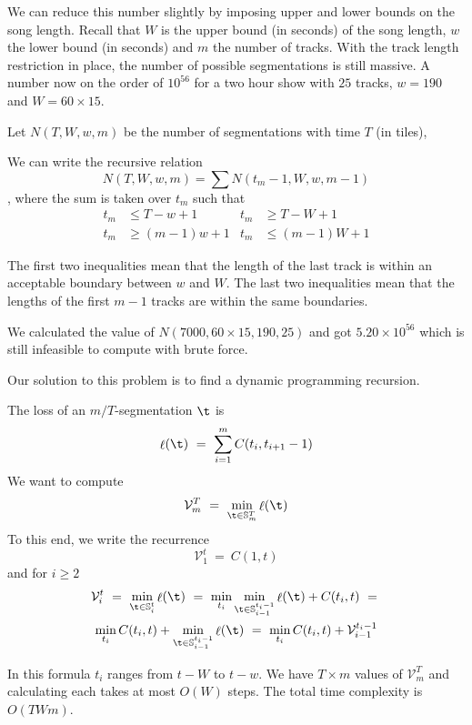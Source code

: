 \documentclass[twocolumn]{article}
\DeclareMathOperator{\loss}{\ell}
\newcommand{\segs}{\mathbb S}
\newcommand{\best}{\mathcal V}
\begin{document}
We can reduce this number slightly by imposing upper and lower bounds on the song length.  Recall that $W$ is the upper bound (in seconds) of the song length, $w$ the lower bound (in seconds) and $m$ the number of tracks. With the track length restriction in place, the number of possible segmentations is still massive. A number now on the order of $10^{56}$ for a two hour show with $25$ tracks, $w=190$ and $W=60\times15$.



  Let $N(T,W,w,m)$ be the number of segmentations with time $T$ (in tiles),

We can write the recursive relation $$N(T,W,w,m) = \sum N(t_m-1,W,w,m-1)$$, where the sum is taken over $t_m$ such that 
\begin{align*}
t_m &\le T-w+1 & t_m &\ge T-W+1\\
t_m &\ge (m-1)w+1 & t_m &\le (m-1)W+1
\end{align*}

The first two inequalities mean that the length of the last track is within an acceptable boundary between $w$ and $W$. The last two inequalities mean that the lengths of the first $m-1$ tracks are within the same boundaries. 

We calculated the value of $N(7000, 60\times15, 190, 25)$ and got $5.20 \times 10^{56}$ which is still infeasible to compute with brute force.



Our solution to this problem is to find a dynamic programming recursion.

The loss of an $m/T$-segmentation $\t$ is 
\[
\loss(\t) 
~=~
\sum_{i=1}^m C(t_i, t_{i+1}-1)
\]
We want to compute
\[
\best^T_m ~=~ \min_{\t \in \segs^T_m} \loss(\t)
\]
To this end, we write the recurrence
\begin{equation*}
\best^t_1 ~=~ C(1, t) 
\end{equation*}
and for $i\ge2$
\begin{multline*}
\best^t_i ~=~
\min_{\t \in \segs^t_i} \loss(\t)
~=~ \min_{t_i} \min_{\t \in \segs^{t_i-1}_{i-1}} \loss(\t) + C(t_i, t)~=~  \\
\min_{t_i} C(t_i, t) + \min_{\t \in \segs^{t_i-1}_{i-1}} \loss(\t) 
~=~ \min_{t_i} C(t_i, t) + \best^{t_i-1}_{i-1}
\end{multline*}

In this formula $t_i$ ranges from $t-W$ to $t-w$. We have $T \times m$ values of $\best^T_m$ and calculating each takes at most $O(W)$ steps. The total time complexity is $O(TWm)$.
\end{document}
